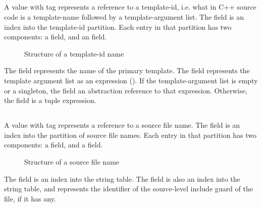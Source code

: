 
\subsection{}
\label{sec:ifc:NameSort:Specialization}

A  value with tag  represents a reference
to a template-id, i.e. what in C++ source code is a template-name followed by a template-argument list.
The  field is an index into the template-id partition.  Each entry in that partition has two components:
a  field, and an  field.
%
\begin{figure}[H]
	\centering
	\caption{Structure of a template-id name}
	\label{fig:ifc-template-id-structure}
\end{figure}
%
The  field represents the name of the primary template.
The  field represents the template argument list as an expression ().
If the template-argument list is empty or a singleton, the  field an abstraction reference
to that expression.  Otherwise, the  field is a tuple expression.


\subsection{}
\label{sec:ifc:NameSort:SourceFile}

A  value with tag  represents a reference
to a source file name. The  field is an index into the partition of source file names.
Each entry in that partition has two components: a  field, and a  field.
%
\begin{figure}[H]
	\centering
	\caption{Structure of a source file name}
	\label{fig:ifc-source-file-name-structure}
\end{figure}
%
The  field is an index into the string table.
The  field is also an index into the string table, and represents the identifier of the source-level
include guard of the file, if it has any.

